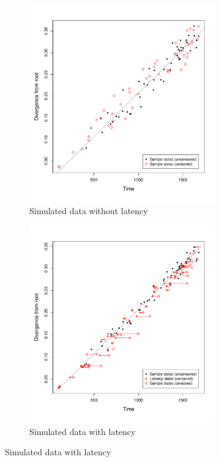 \documentclass[12pt]{article}
\begin{document}
\begin{figure}[ht]
	\centering
	\begin{subfigure}[ht]{8cm}
		\centering
		\includegraphics[width=8cm]{figures/simulated.pdf}
		\caption{Simulated data without latency}
		\label{fig:resultssimulated}
	\end{subfigure}
	\begin{subfigure}[ht]{8cm}
		\includegraphics[width=8cm]{figures/simulated_latent1.pdf}
		\caption{Simulated data with latency}
		\label{fig:resultslatent}
	\end{subfigure}

\end{figure}
\end{document}
